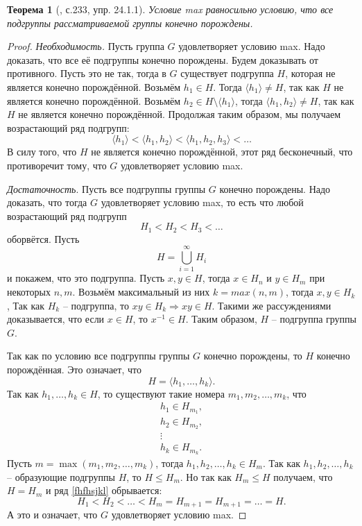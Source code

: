 \documentclass{article}
\newtheorem{theorem}{Теорема}[section]
\begin{document}
\begin{theorem}[\cite{kargapolov}, с.233, упр. 24.1.1] \label{ncvweip}
    Условие max равносильно условию, что все подгруппы рассматриваемой группы конечно порождены.
\end{theorem}
\begin{proof}
    \textit{Необходимость.} Пусть группа $G$ удовлетворяет условию max. Надо доказать, что все её подгруппы конечно порождены.
    Будем доказывать от противного. Пусть это не так, тогда в $G$ существует подгруппа $H$, которая не является конечно порождённой. Возьмём $h_1 \in H$. Тогда $\langle h_1 \rangle \neq H$, так как $H$ не является конечно порождённой.
    Возьмём $h_2 \in H \setminus \langle h_1 \rangle$, тогда $\langle h_1, h_2 \rangle \neq H$, так как $H$ не является конечно порождённой.
    Продолжая таким образом, мы получаем возрастающий ряд подгрупп:
    \[
        \langle h_1 \rangle < \langle h_1, h_2 \rangle < \langle h_1, h_2, h_3 \rangle < \ldots
    \]
    В силу того, что $H$ не является конечно порождённой, этот ряд бесконечный, что противоречит тому, что $G$ удовлетворяет условию max.

    \textit{Достаточность}. Пусть все подгруппы группы $G$ конечно порождены. Надо доказать, что тогда $G$ удовлетворяет условию max, то есть что любой возрастающий ряд подгрупп
    \[
        H_1 < H_2 < H_3 < \ldots
    \]
    оборвётся.
    Пусть $$ H = \bigcup_{i = 1}^{\infty} H_i $$
    и покажем, что это подгруппа.
    Пусть $x, y \in H$, тогда $x \in H_n$ и $y \in H_m$ при некоторых $n, m$. Возьмём максимальный из них $k = max(n, m)$, тогда $x, y \in H_k$, Так как $H_k$ -- подгруппа, то $xy \in H_k \Rightarrow xy \in H$. Такими же рассуждениями доказывается, что если $x \in H$, то $x^{-1} \in H$. Таким образом, $H$ -- подгруппа группы $G$.

    Так как по условию все подгруппы группы $G$ конечно порождены, то $H$ конечно порождённая. Это означает, что
    \begin{equation} \tag{*} \label{fhfhsjkl}
        H = \langle h_1, \ldots, h_k \rangle.
    \end{equation}
    Так как $h_1,\ldots, h_k \in H$, то существуют такие номера $m_1, m_2, \ldots, m_k$, что
    \begin{gather*}
        h_1 \in H_{m_1}, \\
        h_2 \in H_{m_2}, \\
        \vdots \\
        h_k \in H_{m_k}.
    \end{gather*}
    Пусть $m = \max (m_1, m_2, \ldots, m_k)$, тогда $h_1, h_2, \ldots, h_k \in H_m$. Так как $h_1, h_2, \ldots, h_k$ -- образующие подгруппы $H$, то $H \leqslant H_m$. Но так как $H_m \leqslant H$ получаем, что $H = H_m$ и ряд \eqref{fhfhsjkl} обрывается:
    \[
        H_1 < H_2 < \ldots < H_m = H_{m + 1} = H_{m + 1} = \ldots = H.
    \]
    А это и означает, что $G$ удовлетворяет условию max.
\end{proof}
\end{document}
